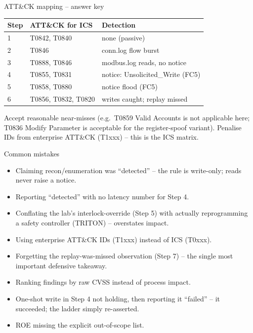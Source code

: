 \documentclass[11pt,a4paper]{article}
\begin{document}
\begin{solutionbox}{ATT\&CK mapping -- answer key}
\small
\begin{tabular}{@{}p{1.0cm}p{5.2cm}p{4.0cm}@{}}
\toprule
\textbf{Step} & \textbf{ATT\&CK for ICS} & \textbf{Detection} \\
\midrule
1 & T0842, T0840           & none (passive) \\
2 & T0846                  & conn.log flow burst \\
3 & T0888, T0846           & modbus.log reads, no notice \\
4 & T0855, T0831           & notice: Unsolicited\_Write (FC5) \\
5 & T0858, T0880           & notice flood (FC5) \\
6 & T0856, T0832, T0820    & writes caught; replay missed \\
\bottomrule
\end{tabular}
\normalsize
\par\vspace{2mm}
Accept reasonable near-misses (e.g.\ T0859 Valid Accounts is not
applicable here; T0836 Modify Parameter is acceptable for the
register-spoof variant). Penalise IDs from enterprise ATT\&CK
(T1xxx) -- this is the ICS matrix.
\end{solutionbox}

\begin{solutionbox}{Common mistakes}
\begin{itemize}\setlength{\itemsep}{1pt}
  \item Claiming recon/enumeration was ``detected'' -- the rule is
        write-only; reads never raise a notice.
  \item Reporting ``detected'' with no latency number for Step 4.
  \item Conflating the lab's interlock-override (Step 5) with actually
        reprogramming a safety controller (TRITON) -- overstates impact.
  \item Using enterprise ATT\&CK IDs (T1xxx) instead of ICS (T0xxx).
  \item Forgetting the replay-was-missed observation (Step 7) -- the
        single most important defensive takeaway.
  \item Ranking findings by raw CVSS instead of process impact.
  \item One-shot write in Step 4 not holding, then reporting it
        ``failed'' -- it succeeded; the ladder simply re-asserted.
  \item ROE missing the explicit out-of-scope list.
\end{itemize}
\end{solutionbox}
\end{document}
